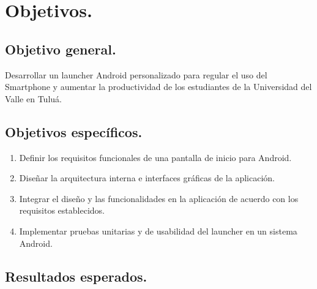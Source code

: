 \section{Objetivos.}

\subsection{Objetivo general.}

Desarrollar un launcher Android personalizado para regular el uso del Smartphone y aumentar la productividad de los estudiantes de la Universidad del Valle en Tuluá.

\subsection{Objetivos espec\'ificos.}	

\begin{enumerate}
    \item Definir los requisitos funcionales de una pantalla de inicio para Android.
    \item Diseñar la arquitectura interna e interfaces gráficas de la aplicación.
    \item Integrar el diseño y las funcionalidades en la aplicación de acuerdo con los requisitos establecidos.
    \item Implementar pruebas unitarias y de usabilidad del launcher en un sistema Android.
\end{enumerate}

\subsection{Resultados esperados.}	

